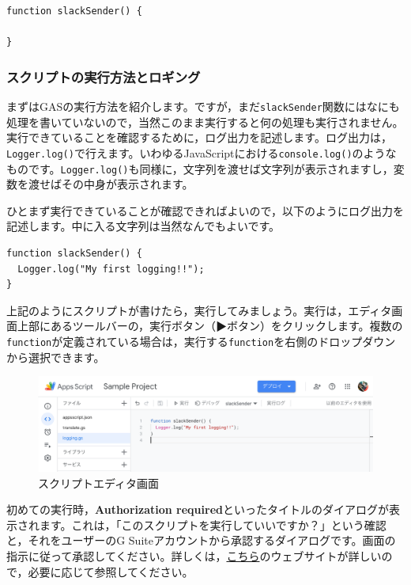 \documentclass[uplatex,a4j]{jsarticle}
\begin{document}
\begin{lstlisting}[basicstyle=\ttfamily\footnotesize,frame=single,caption=Change function name]
function slackSender() {

}
\end{lstlisting}

\subsubsection{スクリプトの実行方法とロギング}

まずはGASの実行方法を紹介します。ですが，まだ\verb|slackSender|関数にはなにも処理を書いていないので，当然このまま実行すると何の処理も実行されません。実行できていることを確認するために，ログ出力を記述します。ログ出力は，\verb|Logger.log()|で行えます。いわゆるJavaScriptにおける\verb|console.log()|のようなものです。\verb|Logger.log()|も同様に，文字列を渡せば文字列が表示されますし，変数を渡せばその中身が表示されます。

ひとまず実行できていることが確認できればよいので，以下のようにログ出力を記述します。中に入る文字列は当然なんでもよいです。

\begin{lstlisting}[basicstyle=\ttfamily\footnotesize,frame=single,caption=Logging]
function slackSender() {
  Logger.log("My first logging!!");
}
\end{lstlisting}


上記のようにスクリプトが書けたら，実行してみましょう。実行は，エディタ画面上部にあるツールバーの，実行ボタン（▶ボタン）をクリックします。複数の\verb|function|が定義されている場合は，実行する\verb|function|を右側のドロップダウンから選択できます。

\begin{figure}[H]
 \centering
 \includegraphics[keepaspectratio, scale=0.6]{images/standalone_gas1.png}
 \caption{スクリプトエディタ画面}
 \label{fig:standalone_gas1}
\end{figure}

初めての実行時，\textbf{Authorization required}といったタイトルのダイアログが表示されます。これは，「このスクリプトを実行していいですか？」という確認と，それをユーザーのG Suiteアカウントから承認するダイアログです。画面の指示に従って承認してください。詳しくは，\href{https://tonari-it.com/gas-script-approval/}{こちら}のウェブサイトが詳しいので，必要に応じて参照してください。
\end{document}
